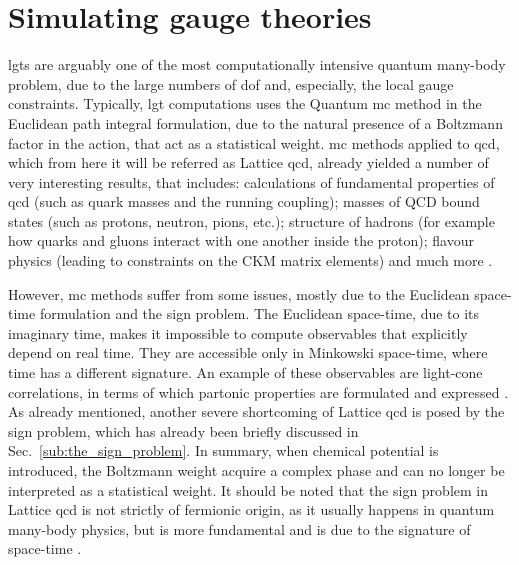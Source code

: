 \section{Simulating gauge theories}
\label{sec:simulating_gauge_theories}


\ac{lgt}s are arguably one of the most computationally intensive quantum many-body problem, due to the large numbers of \ac{dof} and, especially, the local gauge constraints.
Typically, \ac{lgt} computations uses the Quantum \ac{mc} method in the Euclidean path integral formulation, due to the natural presence of a Boltzmann factor in the action, that act as a statistical weight.
\Ac{mc} methods applied to \ac{qcd}, which from here it will be referred as Lattice \ac{qcd}, already yielded a number of very interesting results, that includes:
calculations of fundamental properties of \ac{qcd} (such as quark masses and the running coupling); masses of QCD bound states (such as protons, neutron, pions, etc.); structure of hadrons (for example how quarks and gluons interact with one another inside the proton); flavour physics (leading to constraints on the CKM matrix elements) and much more \cite{lin2018qcd, banuls2020lgtreview}.

However, \ac{mc} methods suffer from some issues, mostly due to the Euclidean space-time formulation and the sign problem.
The Euclidean space-time, due to its imaginary time, makes it impossible to compute observables that explicitly depend on real time.
They are accessible only in Minkowski space-time, where time has a different signature.
An example of these observables are light-cone correlations, in terms of which partonic properties are formulated and expressed \cite{cichy2019lightcone}.
As already mentioned, another severe shortcoming of Lattice \ac{qcd} is posed by the sign problem, which has already been briefly discussed in Sec.~\ref{sub:the_sign_problem}.
In summary, when chemical potential is introduced, the Boltzmann weight acquire a complex phase and can no longer be interpreted as a statistical weight.
It should be noted that the sign problem in Lattice \ac{qcd} is not strictly of fermionic origin, as it usually happens in quantum many-body physics, but is more fundamental and is due to the signature of space-time \cite{banuls2020lgtreview}.

\medskip

